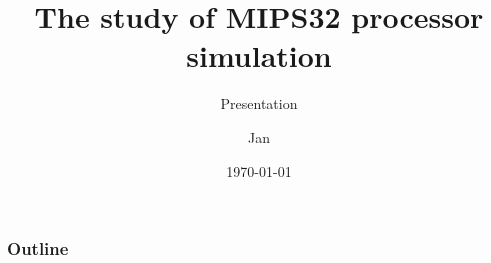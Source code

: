 \documentclass{beamer}
\title{The study of MIPS32 processor simulation}
\subtitle{Presentation}
\author{Jan}
\institute{Copenhagen University}
\date{\today}
\begin{document}
\frame[plain]{\titlepage}

\begin{frame}
	\frametitle{Outline}
	\tableofcontents[currentsection]
\end{frame}
\end{document}
